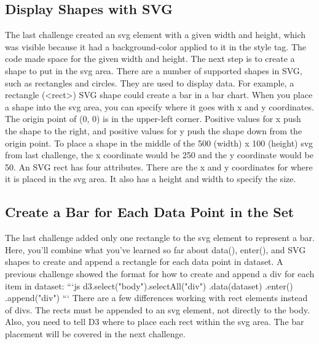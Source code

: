 \documentclass{article}%
\begin{document}
%
\subsection{Display Shapes with SVG}%
\label{subsec:DisplayShapeswithSVG}%
The last challenge created an svg element with a given width and height, which was visible because it had a background{-}color applied to it in the style tag. The code made space for the given width and height.\newline%
The next step is to create a shape to put in the svg area. There are a number of supported shapes in SVG, such as rectangles and circles. They are used to display data. For example, a rectangle (<rect>) SVG shape could create a bar in a bar chart.\newline%
When you place a shape into the svg area, you can specify where it goes with x and y coordinates. The origin point of (0, 0) is in the upper{-}left corner. Positive values for x push the shape to the right, and positive values for y push the shape down from the origin point.\newline%
To place a shape in the middle of the 500 (width) x 100 (height) svg from last challenge, the x coordinate would be 250 and the y coordinate would be 50.\newline%
An SVG rect has four attributes. There are the x and y coordinates for where it is placed in the svg area. It also has a height and width to specify the size.\newline%

%
\subsection{Create a Bar for Each Data Point in the Set}%
\label{subsec:CreateaBarforEachDataPointintheSet}%
The last challenge added only one rectangle to the svg element to represent a bar. Here, you'll combine what you've learned so far about data(), enter(), and SVG shapes to create and append a rectangle for each data point in dataset.\newline%
A previous challenge showed the format for how to create and append a div for each item in dataset:\newline%
```js\newline%
d3.select("body").selectAll("div")\newline%
  .data(dataset)\newline%
  .enter()\newline%
  .append("div")\newline%
```\newline%
There are a few differences working with rect elements instead of divs. The rects must be appended to an svg element, not directly to the body. Also, you need to tell D3 where to place each rect within the svg area. The bar placement will be covered in the next challenge.\newline%
\end{document}
